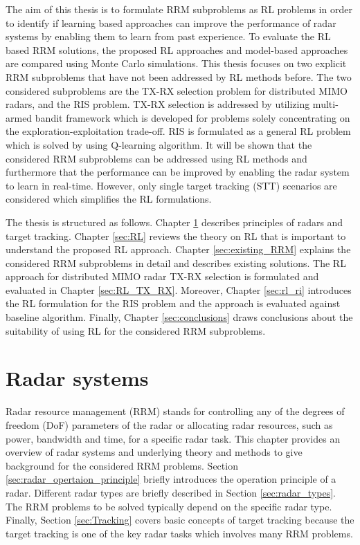 \documentclass[english, 12pt, a4paper, elec, utf8, a-1b, online]{aaltothesis}
\begin{document}
The aim of this thesis is to formulate RRM subproblems as RL problems in order to identify if learning based approaches can improve the performance of radar systems by enabling them to learn from past experience. 
To evaluate the RL based RRM solutions, the proposed RL approaches and model-based approaches are compared using Monte Carlo simulations. 
This thesis focuses on two explicit RRM subproblems that have not been addressed by RL methods before. 
The two considered subproblems are the TX-RX selection problem for distributed MIMO radars, and the RIS problem.
TX-RX selection is addressed by utilizing multi-armed bandit framework which is developed for problems solely concentrating on the exploration-exploitation trade-off. 
RIS is formulated as a general RL problem which is solved by using Q-learning algorithm.
It will be shown that the considered RRM subproblems can be addressed using RL methods and furthermore that the performance can be improved by enabling the radar system to learn in real-time.
However, only single target tracking (STT) scenarios are considered which simplifies the RL formulations. 

The thesis is structured as follows. Chapter \ref{sec:background} describes principles of radars and target tracking. Chapter \ref{sec:RL} reviews the theory on RL that is important to understand the proposed RL approach. 
Chapter \ref{sec:existing_RRM} explains the considered RRM subproblems in detail and describes existing solutions.
The RL approach for distributed MIMO radar TX-RX selection is formulated and evaluated in Chapter \ref{sec:RL_TX_RX}. Moreover,  Chapter \ref{sec:rl_ri} introduces the RL formulation for the RIS problem and the approach is evaluated against baseline algorithm. 
Finally, Chapter \ref{sec:conclusions} draws conclusions about the suitability of using RL for the considered RRM subproblems. 


\clearpage
\section{Radar systems}\label{sec:background}

Radar resource management (RRM) stands for controlling any of the degrees of freedom (DoF) parameters of the radar or allocating radar resources, such as power, bandwidth and time, for a specific radar task.
This chapter provides an overview of radar systems and underlying theory and methods to give background for the considered RRM problems.
Section \ref{sec:radar_opertaion_principle} briefly introduces the operation principle of a radar.
Different radar types are briefly described in Section \ref{sec:radar_types}. 
The RRM problems to be solved typically depend on the specific radar type. 
Finally, Section \ref{sec:Tracking} covers basic concepts of target tracking because the target tracking is one of the key radar tasks which involves many RRM problems.
\end{document}
